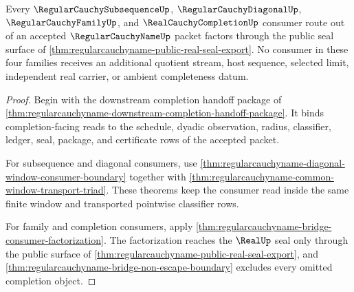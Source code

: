 \begin{theorem}
\label{thm:regularcauchyname-completion-consumer-coverage}
Every $\RegularCauchySubsequenceUp$, $\RegularCauchyDiagonalUp$, $\RegularCauchyFamilyUp$, and $\RealCauchyCompletionUp$ consumer route out of an accepted $\RegularCauchyNameUp$ packet factors through the public seal surface of \autoref{thm:regularcauchyname-public-real-seal-export}. No consumer in these four families receives an additional quotient stream, host sequence, selected limit, independent real carrier, or ambient completeness datum.
\end{theorem}
\begin{proof}
Begin with the downstream completion handoff package of \autoref{thm:regularcauchyname-downstream-completion-handoff-package}. It binds completion-facing reads to the schedule, dyadic observation, radius, classifier, ledger, seal, package, and certificate rows of the accepted packet.

For subsequence and diagonal consumers, use \autoref{thm:regularcauchyname-diagonal-window-consumer-boundary} together with \autoref{thm:regularcauchyname-common-window-transport-triad}. These theorems keep the consumer read inside the same finite window and transported pointwise classifier rows.

For family and completion consumers, apply \autoref{thm:regularcauchyname-bridge-consumer-factorization}. The factorization reaches the $\RealUp$ seal only through the public surface of \autoref{thm:regularcauchyname-public-real-seal-export}, and \autoref{thm:regularcauchyname-bridge-non-escape-boundary} excludes every omitted completion object.
\end{proof}

